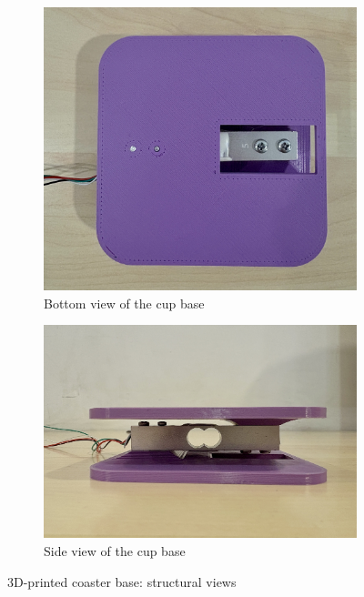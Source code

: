 \begin{figure}[H]
    \centering
    \begin{subfigure}[b]{0.45\linewidth}
        \centering
        \includegraphics[width=\linewidth]{setup_images/base-bottom-view.jpg}
        \caption{Bottom view of the cup base}
        \label{fig:base-bottom}
    \end{subfigure}
    \hfill
    \begin{subfigure}[b]{0.45\linewidth}
        \centering
        \includegraphics[width=\linewidth]{setup_images/base-side-view.jpg}
        \caption{Side view of the cup base}
        \label{fig:base-side}
    \end{subfigure}
    \caption{3D-printed coaster base: structural views}
    \label{fig:cup-base-views}
\end{figure}

